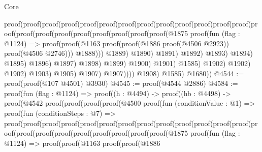 \begin{lexlean}{Core}
\begin{coremodule}
                    proof(proof(proof(proof(proof(proof(proof(proof(proof(proof(proof(proof(proof(proof(proof(proof(proof(proof(proof(proof(proof(proof(@1875
                                                                  proof(fun (flag : @1124) =>
                                                                    proof(proof(@1163
                                                                          proof(proof(@1886
                                                                                proof(@4506 @2923))
                                                                              proof(@4506 @2746)))
                                                                        @1888)))
                                                                @1889)
                                                              @1890)
                                                            @1891)
                                                          @1892)
                                                        @1893)
                                                      @1894)
                                                    @1895)
                                                  @1896)
                                                @1897)
                                              @1898)
                                            @1899)
                                          @1900)
                                        @1901)
                                      @1585)
                                    @1902)
                                  @1902)
                                @1902)
                              @1903)
                            @1905)
                          @1907)
                        @1907))))
              @1908)
            @1585)
          @1680))
@4544 := proof(proof(@107 @4501) @3930)
@4545 := proof(@4544 @2886)
@4584 := proof(fun (flag : @1124) =>
    proof((h : @4494) ->
      proof((hb : @4498) ->
        proof(@4542
            proof(proof(proof(proof(@4500
                      proof(fun (conditionValue : @1) =>
                        proof(fun (conditionSteps : @7) =>
                          proof(proof(proof(proof(proof(proof(proof(proof(proof(proof(proof(proof(proof(proof(proof(proof(proof(proof(proof(proof(proof(proof(@1875
                                                                        proof(fun (flag : @1124) =>
                                                                          proof(proof(@1163
                                                                                proof(proof(@1886

\end{coremodule}
\end{lexlean}
